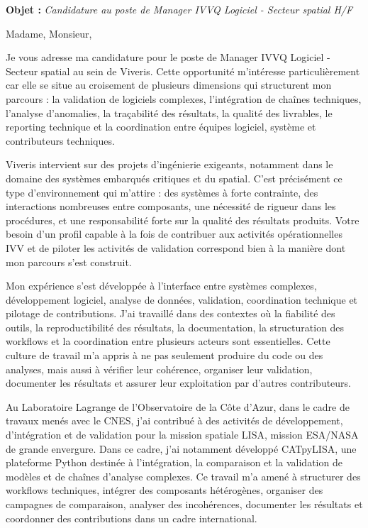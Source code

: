 \documentclass[11pt,a4paper]{../_shared/altacv}
\begin{document}
\makecvheader
\vspace{-0.6cm}

\vspace{-0.4cm}

{\color{accent}\textbf{Objet :}} \textit{Candidature au poste de Manager IVVQ Logiciel - Secteur spatial H/F}

{\color{body}

Madame, Monsieur,

Je vous adresse ma candidature pour le poste de Manager IVVQ Logiciel - Secteur spatial au sein de Viveris. Cette opportunité m'intéresse particulièrement car elle se situe au croisement de plusieurs dimensions qui structurent mon parcours : la validation de logiciels complexes, l'intégration de chaînes techniques, l'analyse d'anomalies, la traçabilité des résultats, la qualité des livrables, le reporting technique et la coordination entre équipes logiciel, système et contributeurs techniques.

Viveris intervient sur des projets d'ingénierie exigeants, notamment dans le domaine des systèmes embarqués critiques et du spatial. C'est précisément ce type d'environnement qui m'attire : des systèmes à forte contrainte, des interactions nombreuses entre composants, une nécessité de rigueur dans les procédures, et une responsabilité forte sur la qualité des résultats produits. Votre besoin d'un profil capable à la fois de contribuer aux activités opérationnelles IVV et de piloter les activités de validation correspond bien à la manière dont mon parcours s'est construit.

Mon expérience s'est développée à l'interface entre systèmes complexes, développement logiciel, analyse de données, validation, coordination technique et pilotage de contributions. J'ai travaillé dans des contextes où la fiabilité des outils, la reproductibilité des résultats, la documentation, la structuration des workflows et la coordination entre plusieurs acteurs sont essentielles. Cette culture de travail m'a appris à ne pas seulement produire du code ou des analyses, mais aussi à vérifier leur cohérence, organiser leur validation, documenter les résultats et assurer leur exploitation par d'autres contributeurs.

Au Laboratoire Lagrange de l'Observatoire de la Côte d'Azur, dans le cadre de travaux menés avec le CNES, j'ai contribué à des activités de développement, d'intégration et de validation pour la mission spatiale LISA, mission ESA/NASA de grande envergure. Dans ce cadre, j'ai notamment développé CATpyLISA, une plateforme Python destinée à l'intégration, la comparaison et la validation de modèles et de chaînes d'analyse complexes. Ce travail m'a amené à structurer des workflows techniques, intégrer des composants hétérogènes, organiser des campagnes de comparaison, analyser des incohérences, documenter les résultats et coordonner des contributions dans un cadre international.

}
\end{document}
